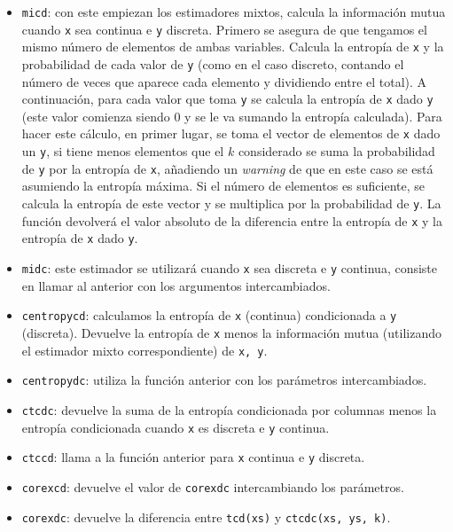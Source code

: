 \documentclass[12pt,a4paper]{report} %
\theoremstyle{definition}
\begin{document}
\begin{itemize}
\item \texttt{micd}: con este empiezan los estimadores mixtos, calcula la información mutua cuando \texttt{x} sea continua e \texttt{y} discreta. Primero se asegura de que tengamos el mismo número de elementos de ambas variables. Calcula la entropía de \texttt{x} y la probabilidad de cada valor de \texttt{y} (como en el caso discreto, contando el número de veces que aparece cada elemento y dividiendo entre el total). A continuación, para cada valor que toma \texttt{y} se calcula la entropía de \texttt{x} dado \texttt{y} (este valor comienza siendo 0 y se le va sumando la entropía calculada). Para hacer este cálculo, en primer lugar, se toma el vector de elementos de \texttt{x} dado un \texttt{y}, si tiene menos elementos que el $k$ considerado se suma la probabilidad de \texttt{y} por la entropía de \texttt{x}, añadiendo un \textit{warning} de que en este caso se está asumiendo la entropía máxima. Si el número de elementos es suficiente, se calcula la entropía de este vector y se multiplica por la probabilidad de \texttt{y}. La función devolverá el valor absoluto de la diferencia entre la entropía de \texttt{x} y la entropía de \texttt{x} dado \texttt{y}.

\item \texttt{midc}: este estimador se utilizará cuando \texttt{x} sea discreta e \texttt{y} continua, consiste en llamar al anterior con los argumentos intercambiados.

\item \texttt{centropycd}: calculamos la entropía de \texttt{x} (continua) condicionada a \texttt{y} (discreta). Devuelve la entropía de \texttt{x} menos la información mutua (utilizando el estimador mixto correspondiente) de \texttt{x, y}.

\item \texttt{centropydc}: utiliza la función anterior con los parámetros intercambiados.

\item \texttt{ctcdc}: devuelve la suma de la entropía condicionada por columnas menos la entropía condicionada cuando \texttt{x} es discreta e \texttt{y} continua.

\item \texttt{ctccd}: llama a la función anterior para \texttt{x} continua e \texttt{y} discreta.

\item \texttt{corexcd}: devuelve el valor de \texttt{corexdc} intercambiando los parámetros.

\item \texttt{corexdc}: devuelve la diferencia entre \texttt{tcd(xs)} y \texttt{ctcdc(xs, ys, k)}.


\end{itemize}
\end{document}
